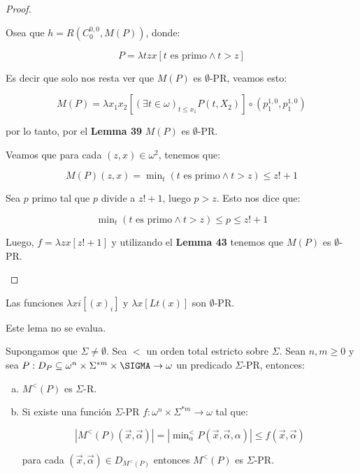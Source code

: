 \begin{proof}
\begin{enumerate}[a)]
        \PN Osea que $h = R \left(C_{0}^{0,0},M(P)\right)$, donde:

        \[
          P = \lambda tzx\left[t \text{ es primo} \wedge t > z\right]
        \]

        \PN Es decir que solo nos resta ver que $M(P)$ es $\emptyset$-PR, veamos esto:

        \[
          M(P) = \lambda x_{1} x_{2} \left[(\exists t \in \omega)_{t \leq x_{1}} P(t, X_{2})\right] \circ (p_{1}^{1,0},
          p_{1}^{1,0})
        \]

        \PN por lo tanto, por el \textbf{Lemma 39} $M(P)$ es $\emptyset$-PR.

        \PN Veamos que para cada $(z,x) \in \omega^{2}$, tenemos que:

        \[
          M(P)(z,x) = \min\nolimits_{t}\left(t \text{ es primo} \wedge t > z\right) \leq z! + 1
        \]

        \PN Sea $p$ primo tal que $p$ divide a $z!+1$, luego $p > z$. Esto nos dice que:

        \[
          \min\nolimits_{t}\left(t \text{ es primo} \wedge t > z\right) \leq p \leq z! + 1
        \]

        \PN Luego, $f = \lambda zx\left[z! + 1\right]$ y utilizando el \textbf{Lemma 43} tenemos que $M(P)$ es
        $\emptyset$-PR.
    \end{enumerate}
  \end{proof}

  \begin{lemma}
    \PN Las funciones $\lambda xi\left[(x)_{i}\right]$ y $\lambda x\left[Lt(x)\right]$ son $\emptyset$-PR.
  \end{lemma}

  \begin{lemma}
    \PN Este lema no se evalua.
  \end{lemma}

  \begin{lemma}
    \PN Supongamos que $\Sigma \neq \emptyset$. Sea $<$ un orden total estricto sobre $\Sigma$. Sean $n, m \geq 0$ y
    sea $P: D_{P} \subseteq \omega^{n} \times \Sigma^{\ast m} \times \SIGMA \rightarrow \omega$ un predicado
    $\Sigma$-PR, entonces:

    \begin{enumerate}[a)]
      \item $M^{<}(P)$ es $\Sigma$-R.
      \item Si existe una función $\Sigma$-PR $f: \omega^{n} \times \Sigma^{\ast m} \rightarrow \omega$ tal que:

        \[
          \left\vert M^{<}(P)(\vec{x},\vec{\alpha})\right\vert = \left\vert \min\nolimits_{\alpha}^{<} P(\vec{x},
          \vec{\alpha},\alpha)\right\vert \leq f(\vec{x},\vec{\alpha})
        \]

        \PN para cada $(\vec{x},\vec{\alpha}) \in D_{M^{< }(P)}$ entonces $M^{<}(P)$ es $\Sigma$-PR.
    \end{enumerate}
  \end{lemma}

